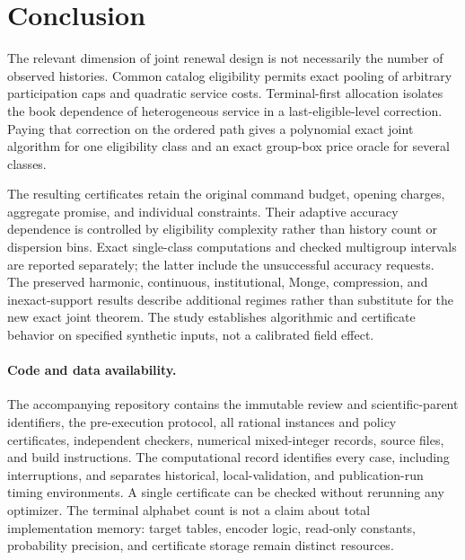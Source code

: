 \section{Conclusion}
The relevant dimension of joint renewal design is not necessarily the number of observed histories. Common catalog eligibility permits exact pooling of arbitrary participation caps and quadratic service costs. Terminal-first allocation isolates the book dependence of heterogeneous service in a last-eligible-level correction. Paying that correction on the ordered path gives a polynomial exact joint algorithm for one eligibility class and an exact group-box price oracle for several classes.

The resulting certificates retain the original command budget, opening charges, aggregate promise, and individual constraints. Their adaptive accuracy dependence is controlled by eligibility complexity rather than history count or dispersion bins. Exact single-class computations and checked multigroup intervals are reported separately; the latter include the unsuccessful accuracy requests. The preserved harmonic, continuous, institutional, Monge, compression, and inexact-support results describe additional regimes rather than substitute for the new exact joint theorem. The study establishes algorithmic and certificate behavior on specified synthetic inputs, not a calibrated field effect.

\paragraph{Code and data availability.}
The accompanying repository contains the immutable review and scientific-parent identifiers, the pre-execution protocol, all rational instances and policy certificates, independent checkers, numerical mixed-integer records, source files, and build instructions. The computational record identifies every case, including interruptions, and separates historical, local-validation, and publication-run timing environments. A single certificate can be checked without rerunning any optimizer. The terminal alphabet count is not a claim about total implementation memory: target tables, encoder logic, read-only constants, probability precision, and certificate storage remain distinct resources.
